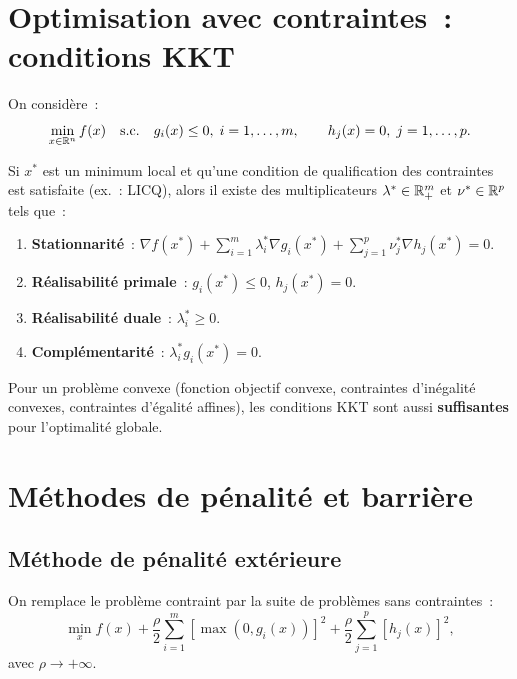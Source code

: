 \section{Optimisation avec contraintes~: conditions KKT}

\begin{definition}
On consid\`ere~:
\[
  \min_{x \in \mathbb{R}^n} f(x) \quad \text{s.c.} \quad
  g_i(x) \leq 0, \; i = 1, \ldots, m, \qquad
  h_j(x) = 0, \; j = 1, \ldots, p.
\]
\end{definition}

\begin{theoreme}
Si $x^*$ est un minimum local et qu'une condition de qualification des
contraintes est satisfaite (ex.~: LICQ), alors il existe des multiplicateurs
$\lambda^* \in \mathbb{R}^m_+$ et $\nu^* \in \mathbb{R}^p$ tels que~:
\begin{enumerate}
  \item \textbf{Stationnarit\'e}~:
        $\nabla f(x^*) + \sum_{i=1}^m \lambda_i^* \nabla g_i(x^*)
        + \sum_{j=1}^p \nu_j^* \nabla h_j(x^*) = 0$.
  \item \textbf{R\'ealisabilit\'e primale}~:
        $g_i(x^*) \leq 0$, $h_j(x^*) = 0$.
  \item \textbf{R\'ealisabilit\'e duale}~: $\lambda_i^* \geq 0$.
  \item \textbf{Compl\'ementarit\'e}~: $\lambda_i^* g_i(x^*) = 0$.
\end{enumerate}
\end{theoreme}

\begin{remarque}
Pour un probl\`eme convexe (fonction objectif convexe, contraintes
d'in\'egalit\'e convexes, contraintes d'\'egalit\'e affines), les conditions
KKT sont aussi \textbf{suffisantes} pour l'optimalit\'e globale.
\end{remarque}

\section{M\'ethodes de p\'enalit\'e et barri\`ere}

\subsection{M\'ethode de p\'enalit\'e ext\'erieure}

\begin{definition}
On remplace le probl\`eme contraint par la suite de probl\`emes sans
contraintes~:
\[
  \min_{x} f(x) + \frac{\rho}{2} \sum_{i=1}^m [\max(0, g_i(x))]^2
  + \frac{\rho}{2} \sum_{j=1}^p [h_j(x)]^2,
\]
avec $\rho \to +\infty$.
\end{definition}

